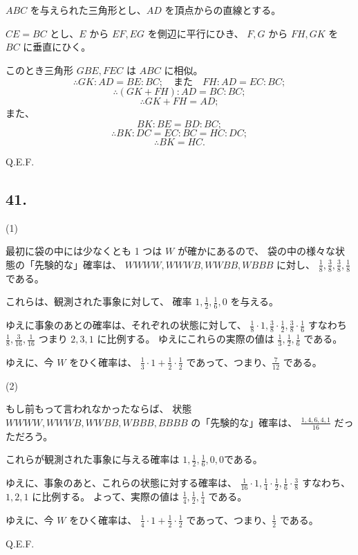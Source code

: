 $ABC$ を与えられた三角形とし、$AD$ を頂点からの直線とする。

$CE = BC$ とし、$E$ から $EF, EG$ を側辺に平行にひき、
$F, G$  から $FH, GK$ を $BC$ に垂直にひく。

このとき三角形 $GBE, FEC$ は $ABC$ に相似。
\[
\therefore
GK : AD = BE : BC;
\quad \mbox{また} \quad
FH : AD = EC : BC;
\]
\[
\therefore
(GK + FH) : AD = BC : BC;
\]
\[
\therefore
GK + FH = AD;
\]
また、
\[
BK : BE = BD : BC;
\]
\[
\therefore
BK : DC = EC : BC = HC : DC;
\]
\[
\therefore
BK = HC.
\]

Q.E.F.



\subsection*{41.}

(1)

最初に袋の中には少なくとも 1 つは $W$ が確かにあるので、
袋の中の様々な状態の「先験的な」確率は、
$WWWW, WWWB, WWBB, WBBB$ に対し、
$\frac{1}{8},\frac{3}{8},\frac{3}{8},\frac{1}{8}$
である。

これらは、観測された事象に対して、
確率 $1, \frac{1}{2}, \frac{1}{6}, 0$ を与える。

ゆえに事象のあとの確率は、それぞれの状態に対して、
$\frac{1}{8} \cdot 1, \frac{3}{8} \cdot \frac{1}{2},
\frac{3}{8} \cdot \frac{1}{6}$
すなわち $\frac{1}{8}, \frac{3}{16}, \frac{1}{16}$ 
つまり $2, 3, 1$ に比例する。
ゆえにこれらの実際の値は $\frac{1}{3}, \frac{1}{2}, \frac{1}{6}$ 
である。

ゆえに、今 $W$ をひく確率は、
$\frac{1}{3} \cdot 1 + \frac{1}{2} \cdot \frac{1}{2}$
であって、つまり、$\frac{7}{12}$ である。

(2)

もし前もって言われなかったならば、
状態 $WWWW, WWWB, WWBB, WBBB, BBBB$ の「先験的な」確率は、
$\frac{1, 4, 6, 4, 1}{16}$ だっただろう。

これらが観測された事象に与える確率は
$1, \frac{1}{2}, \frac{1}{6}, 0, 0$である。

ゆえに、事象のあと、これらの状態に対する確率は、
$\frac{1}{16} \cdot 1, \frac{1}{4} \cdot \frac{1}{2},
\frac{1}{6} \cdot \frac{3}{8}$
すなわち、
$1, 2, 1$ に比例する。
よって、実際の値は $\frac{1}{4}, \frac{1}{2}, \frac{1}{4}$
である。

ゆえに、今 $W$ をひく確率は、
$\frac{1}{4} \cdot 1 + \frac{1}{2} \cdot \frac{1}{2}$
であって、つまり、$\frac{1}{2}$ である。

Q.E.F.

